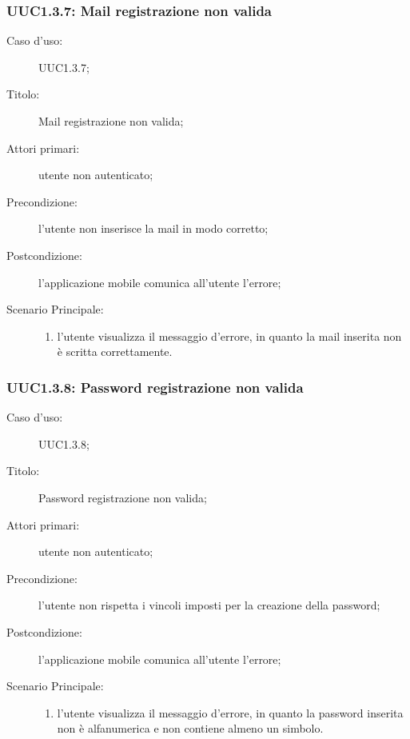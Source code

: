\documentclass[../../../analisi-dei-requisiti.tex]{subfiles}
\begin{document}
\subsubsection{UUC1.3.7: Mail registrazione non valida}%
\label{subs:UUC1.3.7}
\begin{description}
  \item[Caso d'uso:] UUC1.3.7;
  \item[Titolo:] Mail registrazione non valida;
  \item[Attori primari:] utente non autenticato;
  \item[Precondizione:] l'utente non inserisce la mail in modo corretto;
  \item[Postcondizione:] l'applicazione mobile comunica all'utente l'errore;
  \item[Scenario Principale:]
        \begin{enumerate}
          \item l'utente visualizza il messaggio d'errore, in quanto la mail inserita non è scritta correttamente.
        \end{enumerate}
\end{description}

\subsubsection{UUC1.3.8: Password registrazione non valida}%
\label{subs:UUC1.3.8}
\begin{description}
  \item[Caso d'uso:] UUC1.3.8;
  \item[Titolo:] Password registrazione non valida;
  \item[Attori primari:] utente non autenticato;
  \item[Precondizione:] l'utente non rispetta i vincoli imposti per la creazione della password;
  \item[Postcondizione:] l'applicazione mobile comunica all'utente l'errore;
  \item[Scenario Principale:]
        \begin{enumerate}
          \item l'utente visualizza il messaggio d'errore, in quanto la password inserita non è alfanumerica e non contiene almeno un simbolo.
        \end{enumerate}
\end{description}
\end{document}
